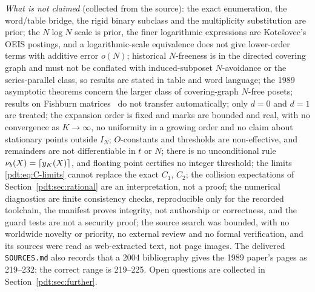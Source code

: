 \begin{writenote}
\emph{What is not claimed} (collected from the source): the exact
enumeration, the word/table bridge, the rigid binary subclass and the
multiplicity substitution are prior; the $N\log N$ scale is prior, the finer
logarithmic expressions are Kote\v{s}ovec's OEIS postings, and a
logarithmic-scale equivalence does not give lower-order terms with additive
error $o(N)$; historical $N$-freeness is in the directed covering graph and
must not be conflated with induced-subposet $N$-avoidance or the
series-parallel class, so results are stated in table and word language;
the 1989 asymptotic theorems concern the larger class of covering-graph
$N$-free posets; results on Fishburn matrices~\cite{hj} do not transfer
automatically; only $d=0$ and $d=1$ are treated; the expansion order is
fixed and marks are bounded and real, with no convergence as $K\to\infty$,
no uniformity in a growing order and no claim about stationary points
outside $I_N$; $O$-constants and thresholds are non-effective, and
remainders are not differentiable in $t$ or $N$; there is no unconditional
rule $\nu_b(X)=\left\lceil y_K(X)\right\rceil$, and floating point certifies no integer
threshold; the limits \eqref{pdt:eq:C-limits} cannot replace the exact
$C_1$, $C_2$; the collision expectations of Section~\ref{pdt:sec:rational}
are an interpretation, not a proof; the numerical diagnostics are finite
consistency checks, reproducible only for the recorded toolchain, the
manifest proves integrity, not authorship or correctness, and the guard
tests are not a security proof; the source search was bounded, with no
worldwide novelty or priority, no external review and no formal
verification, and its sources were read as web-extracted text, not page
images. The delivered \nolinkurl{SOURCES.md} also records that a 2004
bibliography gives the 1989 paper's pages as 219--232; the correct range is
219--225. Open questions are collected in Section~\ref{pdt:sec:further}.
\end{writenote}
